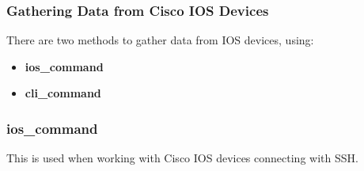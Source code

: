 \documentclass{beamer}
\begin{document}
\begin{frame}
    \frametitle{Gathering Data from Cisco IOS Devices}
    There are two methods to gather data from IOS devices, using:
    \begin{itemize}
        \item<2-> \textbf{ios\_command}
        \item<3-> \textbf{cli\_command}
    \end{itemize}
\end{frame}

\begin{frame}
    \frametitle{ios\_command}
    This is used when working with Cisco IOS devices connecting with SSH.
    
\end{frame}
\end{document}
